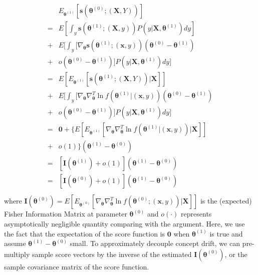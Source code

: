 \documentclass[twoside,11pt]{article}
\begin{document}
\begin{align}
\begin{aligned}
& E _{\bm { \theta}^{ (1)}}[\bm{s}(\bm { \theta}^{ (0)}; (\bm {X}, Y))] \\
= & E[\int _{y} \bm{s}(\bm { \theta}^{ (1)}; (\bm {X}, y))P (y| \bm {X}, \bm{\theta}^{ (1)}) d y ] \\ 
 +&  E[\int _{y} [  \nabla _{\bm { \theta}}{ \bm{s}(\bm { \theta}^{ (1)}; (\bm {x}, y))}(\bm { \theta}^ { (0)} - \bm { \theta} ^{ (1)}) \\ 
 +& o(\bm { \theta}^ { (0)} - \bm { \theta} ^{ (1)} ) ] P (y| \bm {X}, \bm{\theta}^{ (1)}) d y]\\ 
= & E[E _{\bm { \theta}^{ (1)}}[\bm{s}(\bm { \theta}^{ (1)}; (\bm {X}, Y))| \bm {X}]] \\
+ & E[\int _{y} [ \nabla_{\bm { \theta}} \nabla^T _{\bm { \theta}}{ \ln f(\bm { \theta}^{ (1)}| (\bm {x}, y))}(\bm { \theta}^ { (0)} - \bm { \theta} ^{ (1)}) \\
+ & o(\bm { \theta}^ { (0)}- \bm { \theta}^{ (1)})]P (y| \bm {X}, \bm{\theta}^{ (1)}) dy] \\
= & \bm{0} +  \{E[E _{\bm { \theta}^{ (1)}}[\nabla_{\bm { \theta}} \nabla ^T_{\bm { \theta}}{ \ln {f}(\bm { \theta}^{ (1)}| (\bm {x}, y))} | \bm {X}]] \\ + &o(1)\}(\bm { \theta}^{ (1)} - \bm { \theta}^ { (0)}) \\
= & [{\mathbf {I}}(\bm { \theta}^{ (1)})+ o(1)](\bm { \theta}^{ (1)} - \bm { \theta}^ { (0)}) \\
= & [{\mathbf {I}}(\bm { \theta}^{ (0)})+ o(1)](\bm { \theta}^{ (1)} - \bm { \theta}^ { (0)}) \\
\end{aligned}
\label{eqn:cd_decomp_fisher_approx}
\end{align}
where {${\mathbf {I}}(\bm { \theta}^{ (0)})=E[E _{\bm { \theta}^{ (0)}}[\nabla_{\bm { \theta}} \nabla^T _{\bm { \theta}}{ \ln{f}(\bm { \theta}^{ (0)}; (\bm {x}, y))} | \bm {X}]]$} is the (expected) Fisher Information Matrix {at parameter $\bm { \theta} ^{ (0)}$} and $o(\cdot)$ represents asymptotically negligible quantity comparing with the argument. Here, we use the fact that the expectation of the score function is $\bm {0}$ when {$\bm { \theta}^{ (1)}$} is true and assume {$ \bm { \theta}^ { (1)} - \bm { \theta}^{ (0)} $} small. To approximately decouple concept drift, we can pre-multiply sample score vectors by {the} inverse of {the} estimated {${\mathbf {I}}(\bm { \theta}^{ (0)})$}, or the sample covariance matrix of {the score function.}
\end{document}
